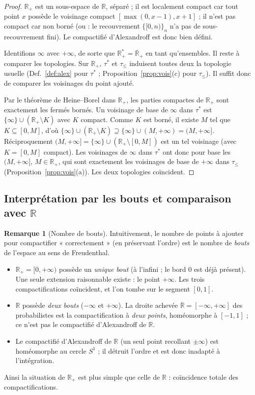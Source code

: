 \documentclass[11pt,a4paper]{article}
\theoremstyle{plain}
\theoremstyle{definition}
\newtheorem{remark}[theorem]{Remarque}
\newcommand{\R}{\mathbb{R}}
\newcommand{\Rp}{\mathbb{R}_+}
\newcommand{\Rpb}{\overline{\mathbb{R}}_+}
\newcommand{\Rb}{\overline{\mathbb{R}}}
\begin{document}
\begin{proof}
$\Rp$ est un sous-espace de $\R$, séparé ; il est localement compact car tout
point $x$ possède le voisinage compact $[\max(0,x-1),x+1]$ ; il n'est pas
compact car non borné (ou : le recouvrement $\{[0,n)\}_n$ n'a pas de
sous-recouvrement fini). Le compactifié d'Alexandroff est donc bien défini.

Identifions $\infty$ avec $+\infty$, de sorte que $\Rp^*=\Rpb$ en tant
qu'ensembles. Il reste à comparer les topologies. Sur $\Rp$, $\tau^*$ et
$\tau_\le$ induisent toutes deux la topologie usuelle (Def.~\ref{def:alex}
pour $\tau^*$ ; Proposition~\ref{prop:vois}(c) pour $\tau_\le$). Il suffit donc
de comparer les voisinages du point ajouté.

Par le théorème de Heine--Borel dans $\Rp$, les parties compactes de $\Rp$ sont
exactement les fermés bornés. Un voisinage de base de $\infty$ dans $\tau^*$ est
$\{\infty\}\cup(\Rp\setminus K)$ avec $K$ compact. Comme $K$ est borné, il
existe $M$ tel que $K\subseteq[0,M]$, d'où
$\{\infty\}\cup(\Rp\setminus K)\supseteq\{\infty\}\cup(M,+\infty)=(M,+\infty]$.
Réciproquement $(M,+\infty]=\{\infty\}\cup(\Rp\setminus[0,M])$ est un tel
voisinage (avec $K=[0,M]$ compact). Les voisinages de $\infty$ dans $\tau^*$ ont
donc pour base les $(M,+\infty]$, $M\in\Rp$, qui sont exactement les voisinages
de base de $+\infty$ dans $\tau_\le$ (Proposition~\ref{prop:vois}(a)). Les deux
topologies coïncident.
\end{proof}

\subsection{Interprétation par les bouts et comparaison avec $\R$}

\begin{remark}[Nombre de bouts]
Intuitivement, le nombre de points à ajouter pour compactifier « correctement »
(en préservant l'ordre) est le nombre de \emph{bouts} de l'espace au sens de
Freudenthal.
\begin{itemize}[nosep]
\item $\Rp=[0,+\infty)$ possède un \emph{unique bout} (à l'infini ; le bord $0$
est déjà présent). Une seule extension raisonnable existe : le point $+\infty$.
Les trois compactifications coïncident, et l'on tombe sur le segment $[0,1]$.
\item $\R$ possède \emph{deux bouts} ($-\infty$ et $+\infty$). La droite achevée
$\Rb=[-\infty,+\infty]$ des probabilistes est la compactification à
\emph{deux points}, homéomorphe à $[-1,1]$ ; ce n'est pas le compactifié
d'Alexandroff de $\R$.
\item Le compactifié d'Alexandroff de $\R$ (un seul point recollant $\pm\infty$)
est homéomorphe au cercle $S^1$ ; il détruit l'ordre et est donc inadapté à
l'intégration.
\end{itemize}
Ainsi la situation de $\Rp$ est plus simple que celle de $\R$ : coïncidence
totale des compactifications.
\end{remark}
\end{document}
